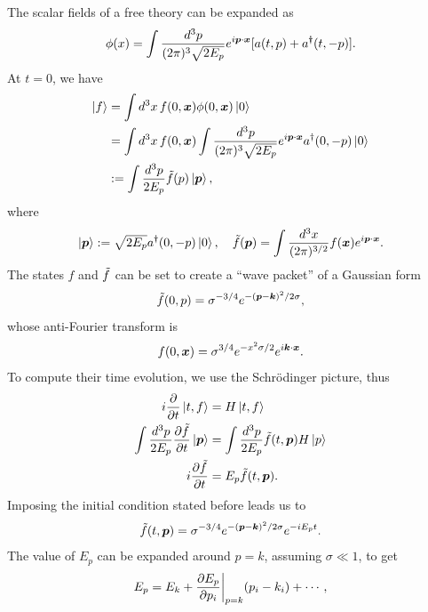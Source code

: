 The scalar fields of a free theory can be expanded as 
\begin{equation}
    \phi(x) = \int \frac{d^3p}{(2\pi)^3\sqrt{2E_p}}e^{i\bm{p}\cdot\bm{x}}[a(t,p) + a^\dagger(t,-p)].
\end{equation}
At $t = 0$, we have 
\begin{equation}
    \begin{split}
        \ket{f} &= \int d^3x\,f(0,\bm{x})\phi(0,\bm{x})\ket{0} \\
        &= \int d^3x\,f(0,\bm{x})\int \frac{d^3p}{(2\pi)^3\sqrt{2E_p}}e^{i\bm{p}\cdot\bm{x}}a^\dagger(0,-p)\ket{0} \\
        &:= \int \frac{d^3p}{2E_p}\tilde{f}(p)\ket{\bm{p}},
    \end{split}
\end{equation} 
where 
\begin{equation}
    \ket{\bm{p}} := \sqrt{2E_p}a^\dagger(0,-p)\ket{0},\quad \tilde{f}(\bm{p}) = \int \frac{d^3x}{(2\pi)^{3/2}}f(\bm{x})e^{i\bm{p}\cdot\bm{x}}.
\end{equation}
The states $f$ and $\tilde{f}$ can be set to create a ``wave packet'' of a Gaussian form 
\begin{equation}
    \tilde{f}(0,p) = \sigma^{-3/4}e^{-(\bm{p} - \bm{k})^2/2\sigma},
\end{equation}
whose anti-Fourier transform is 
\begin{equation}
    f(0,\bm{x}) = \sigma^{3/4}e^{-x^2\sigma/2}e^{i\bm{k}\cdot\bm{x}}.
\end{equation}
To compute their time evolution, we use the Schr\"odinger picture, thus 
\begin{equation}
    \begin{split}
        i\frac{\partial}{\partial t}\ket{t,f} &= H\ket{t,f} \\
        \int \frac{d^3p}{2E_p}\frac{\partial\tilde{f}}{\partial t}\ket{\bm{p}} &= \int \frac{d^3p}{2E_p}\tilde{f}(t,\bm{p})H\ket{p} \\
        i\frac{\partial \tilde{f}}{\partial t} &= E_p\tilde{f}(t,\bm{p}).
    \end{split}
\end{equation}
Imposing the initial condition stated before leads us to 
\begin{equation}
    \tilde{f}(t,\bm{p}) = \sigma^{-3/4}e^{-(\bm{p} - \bm{k})^2/2\sigma}e^{-iE_pt}.
\end{equation}
The value of $E_p$ can be expanded around $p = k$, assuming $\sigma \ll 1$, to get 
\begin{equation}
    E_p = E_k + \frac{\partial E_p}{\partial p_i}\bigg|_{p = k}(p_i - k_i) + \cdots,
\end{equation}
